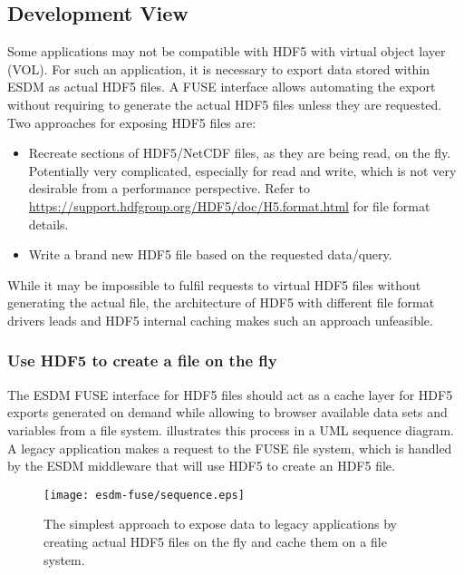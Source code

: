 \subsection{Development View}
\label{sec: fuse/development}

%


Some applications may not be compatible with HDF5 with virtual object layer (VOL).
For such an application, it is necessary to export data stored within ESDM as actual HDF5 files.
A FUSE interface allows automating the export without requiring to generate the actual HDF5 files unless they are requested.
Two approaches for exposing HDF5 files are:

\begin{itemize}
	\item Recreate sections of HDF5/NetCDF files, as they are being read, on the fly. Potentially very complicated, especially for read and write, which is not very desirable from a performance perspective. Refer to \url{https://support.hdfgroup.org/HDF5/doc/H5.format.html} for file format details.
	\item Write a brand new HDF5 file based on the requested data/query.
\end{itemize}

While it may be impossible to fulfil requests to virtual HDF5 files without generating the actual file, the architecture of HDF5 with different file format drivers leads and HDF5 internal caching makes such an approach unfeasible.


\subsubsection{Use HDF5 to create a file on the fly}

The ESDM FUSE interface for HDF5 files should act as a cache layer for HDF5 exports generated on demand while allowing
to browser available data sets and variables from a file system.
 illustrates this process in a UML sequence diagram.
A legacy application makes a request to the FUSE file system, which is handled by the ESDM middleware that will use HDF5 to create an HDF5 file.


\begin{figure}
	\centering
	\texttt{[image: esdm-fuse/sequence.eps]}
	\caption{The simplest approach to expose data to legacy applications by creating actual HDF5 files on the fly and cache them on a file system.}
	\label{fig:fuse hdf5 sequence}
\end{figure}



